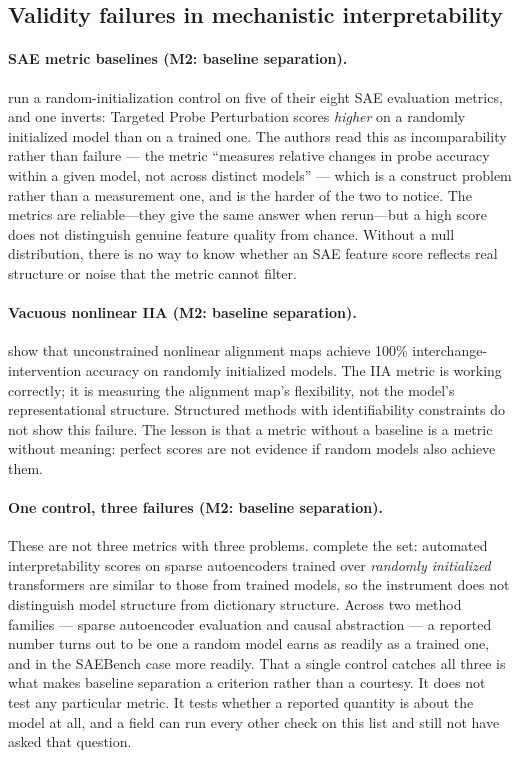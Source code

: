 \documentclass{article}
\begin{document}
\subsection{Validity failures in mechanistic interpretability}
\label{sec:mi-failures}

\paragraph{SAE metric baselines (M2: baseline separation).}
\citet{karvonen2025saebench} run a random-initialization control on five of their eight SAE evaluation metrics, and one inverts: Targeted Probe Perturbation scores \emph{higher} on a randomly initialized model than on a trained one. The authors read this as incomparability rather than failure --- the metric ``measures relative changes in probe accuracy within a given model, not across distinct models'' --- which is a construct problem rather than a measurement one, and is the harder of the two to notice. The metrics are reliable---they give the same answer when rerun---but a high score does not distinguish genuine feature quality from chance. Without a null distribution, there is no way to know whether an SAE feature score reflects real structure or noise that the metric cannot filter.

\paragraph{Vacuous nonlinear IIA (M2: baseline separation).}
\citet{sutter2025nonlinear} show that unconstrained nonlinear alignment maps achieve 100\% interchange-intervention accuracy on randomly initialized models. The IIA metric is working correctly; it is measuring the alignment map's flexibility, not the model's representational structure. Structured methods with identifiability constraints do not show this failure. The lesson is that a metric without a baseline is a metric without meaning: perfect scores are not evidence if random models also achieve them.

\paragraph{One control, three failures (M2: baseline separation).}
These are not three metrics with three problems. \citet{heap2025sparse} complete the set:
automated interpretability scores on sparse autoencoders trained over \emph{randomly
initialized} transformers are similar to those from trained models, so the instrument does
not distinguish model structure from dictionary structure. Across two method families ---
sparse autoencoder evaluation and causal abstraction --- a reported number turns out to be
one a random model earns as readily as a trained one, and in the SAEBench case more
readily. That a single control catches all three is what makes baseline separation a
criterion rather than a courtesy. It does not test any particular metric. It tests whether
a reported quantity is about the model at all, and a field can run every other check on
this list and still not have asked that question.
\end{document}
